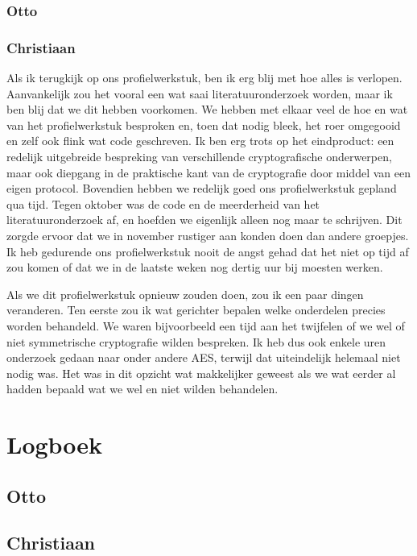 \documentclass{report} %
\begin{document}
\subsection{Otto}


\subsection{Christiaan}
Als ik terugkijk op ons profielwerkstuk, ben ik erg blij met hoe alles is verlopen. Aanvankelijk zou het vooral een wat saai literatuuronderzoek worden, maar ik ben blij dat we dit hebben voorkomen. We hebben met elkaar veel de hoe en wat van het profielwerkstuk besproken en, toen dat nodig bleek, het roer omgegooid en zelf ook flink wat code geschreven. Ik ben erg trots op het eindproduct: een redelijk uitgebreide bespreking van verschillende cryptografische onderwerpen, maar ook diepgang in de praktische kant van de cryptografie door middel van een eigen protocol. Bovendien hebben we redelijk goed ons profielwerkstuk gepland qua tijd. Tegen oktober was de code en de meerderheid van het literatuuronderzoek af, en hoefden we eigenlijk alleen nog maar te schrijven. Dit zorgde ervoor dat we in november rustiger aan konden doen dan andere groepjes. Ik heb gedurende ons profielwerkstuk nooit de angst gehad dat het niet op tijd af zou komen of dat we in de laatste weken nog dertig uur bij moesten werken.
\par Als we dit profielwerkstuk opnieuw zouden doen, zou ik een paar dingen veranderen. Ten eerste zou ik wat gerichter bepalen welke onderdelen precies worden behandeld. We waren bijvoorbeeld een tijd aan het twijfelen of we wel of niet symmetrische cryptografie wilden bespreken. Ik heb dus ook enkele uren onderzoek gedaan naar onder andere AES, terwijl dat uiteindelijk helemaal niet nodig was. Het was in dit opzicht wat makkelijker geweest als we wat eerder al hadden bepaald wat we wel en niet wilden behandelen.

\printbibliography

\chapter{Logboek}
\section{Otto}

\section{Christiaan}
\end{document}
